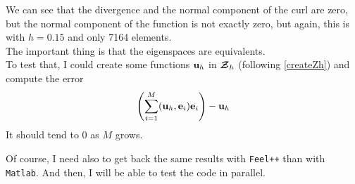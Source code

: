We can see that the divergence and the normal component of the curl are zero, but the normal component of the function is not exactly zero, but again, this is with $h=0.15$ and only 7164 elements.\\
The important thing is that the eigenspaces are equivalents.\\
To test that, I could create some functions ${\mathbf{u}}_h$ in ${\bm{\mathcal{Z}}}_h$ (following \ref{createZh}) and compute the error
\[ \left(\sum_{i=1}^M ({\mathbf{u}}_h,{\mathbf{e}}_i){\mathbf{e}}_i\right) - {\mathbf{u}}_h \]
It should tend to 0 as $M$ grows.

Of course, I need also to get back the same results with \texttt{Feel++} than with \texttt{Matlab}. And then, I will be able to test the code in parallel.





